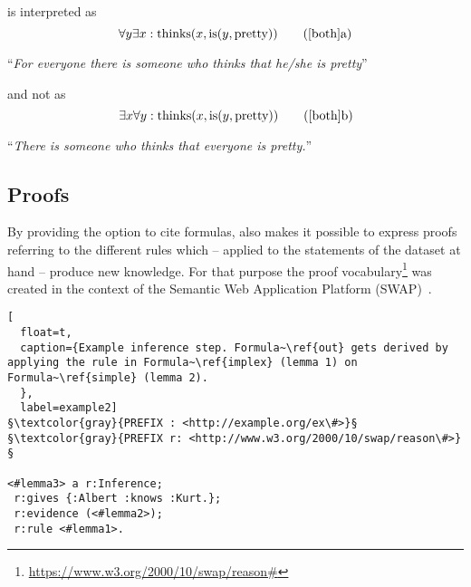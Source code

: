  is interpreted as 
\begin{equation} %
\forall y \exists x : \text{thinks}(x,\text{is}(y,\text{pretty})) \tag{\ref{both}a}
\end{equation}
\begin{center}``\textit{For everyone there is someone who thinks that he/she is pretty}''\end{center}
and not as
\begin{equation} %
\exists x \forall  y : \text{thinks}(x,\text{is}(y,\text{pretty})) \tag{\ref{both}b}
\end{equation}
\begin{center}``\textit{There is someone who thinks that everyone is pretty.}'' \end{center}

% 
\subsection{Proofs}\label{proofintro}

By providing the option to cite formulas, \nthree also makes it possible to express proofs referring to the different rules which -- applied to the statements
of the dataset at hand 
--
produce new knowledge. %
For that purpose the %
 \nthree proof 
vocabulary\footnote{\url{https://www.w3.org/2000/10/swap/reason\#}}  was
created in the context of the Semantic Web Application
Platform (SWAP)~\cite{SWAP}.
\begin{lstlisting}[
  float=t,
  caption={Example inference step. Formula~\ref{out} gets derived by applying the rule in Formula~\ref{implex} (lemma 1) on Formula~\ref{simple} (lemma 2). 
  },
  label=example2]
§\textcolor{gray}{PREFIX : <http://example.org/ex\#>}§
§\textcolor{gray}{PREFIX r: <http://www.w3.org/2000/10/swap/reason\#>}§

<#lemma3> a r:Inference; 
 r:gives {:Albert :knows :Kurt.}; 
 r:evidence (<#lemma2>);
 r:rule <#lemma1>.
\end{lstlisting}

